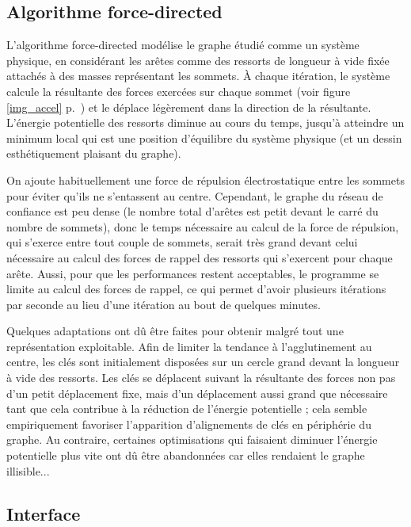 \documentclass[a4paper]{article}
\begin{document}
\subsection{Algorithme force-directed}

L'algorithme force-directed modélise le graphe étudié comme un système physique, en considérant les arêtes comme des ressorts de longueur à vide fixée attachés à des masses représentant les sommets. À chaque itération, le système calcule la résultante des forces exercées sur chaque sommet (voir figure \ref{img_accel} p.~\pageref{img_accel}) et le déplace légèrement dans la direction de la résultante. L'énergie potentielle des ressorts diminue au cours du temps, jusqu'à atteindre un minimum local qui est une position d'équilibre du système physique (et un dessin esthétiquement plaisant du graphe).

On ajoute habituellement une force de répulsion électrostatique entre les sommets pour éviter qu'ils ne s'entassent au centre. Cependant, le graphe du réseau de confiance est peu dense (le nombre total d'arêtes est petit devant le carré du nombre de sommets), donc le temps nécessaire au calcul de la force de répulsion, qui s'exerce entre tout couple de sommets, serait très grand devant celui nécessaire au calcul des forces de rappel des ressorts qui s'exercent pour chaque arête. Aussi, pour que les performances restent acceptables, le programme se limite au calcul des forces de rappel, ce qui permet d'avoir plusieurs itérations par seconde au lieu d'une itération au bout de quelques minutes.

Quelques adaptations ont dû être faites pour obtenir malgré tout une représentation exploitable. Afin de limiter la tendance à l'agglutinement au centre, les clés sont initialement disposées sur un cercle grand devant la longueur à vide des ressorts. Les clés se déplacent suivant la résultante des forces non pas d'un petit déplacement fixe, mais d'un déplacement aussi grand que nécessaire tant que cela contribue à la réduction de l'énergie potentielle ; cela semble empiriquement favoriser l'apparition d'alignements de clés en périphérie du graphe. Au contraire, certaines optimisations qui faisaient diminuer l'énergie potentielle plus vite ont dû être abandonnées car elles rendaient le graphe illisible...

\subsection{Interface}
\end{document}
